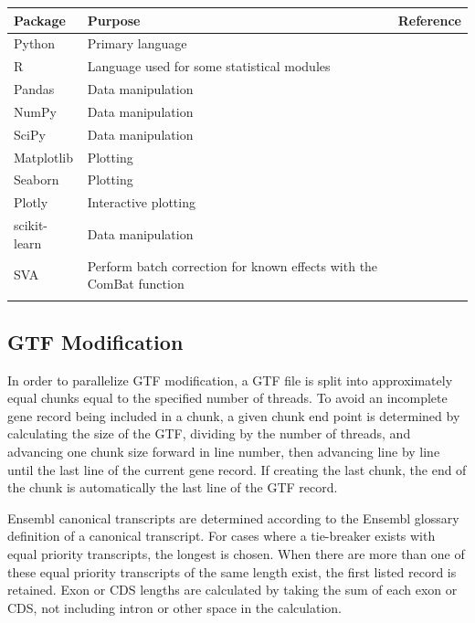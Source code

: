 \documentclass[10pt, oneside]{article}
\begin{document}
\begin{table}[!]
    \centering
{}
\begin{tabular}{p{2.4cm}p{7.5cm}p{3cm}}
 \textbf{Package} & \textbf{Purpose} & \textbf{Reference} \\
 \hline
 Python & Primary language & \\
 \hline
 R & Language used for some statistical modules & \\
 \hline
 Pandas & Data manipulation & \cite{pandas} \\
 \hline
 NumPy & Data manipulation & \cite{numpy1, numpy2} \\
 \hline
 SciPy & Data manipulation & \cite{scipy} \\
 \hline
 Matplotlib & Plotting & \cite{matplotlib} \\
 \hline
 Seaborn & Plotting & \cite{seaborn} \\
 \hline
 Plotly & Interactive plotting & \cite{plotly} \\
 \hline
 scikit-learn & Data manipulation & \cite{sklearn} \\
 \hline
 SVA & Perform batch correction for known effects with the ComBat function & \cite{sva} \\
 \label{Tab:software_plot}
 \end{tabular}
\end{table}

\subsection{GTF Modification}
In order to parallelize GTF modification, a GTF file is split into approximately equal chunks equal to the specified number of threads. To avoid an incomplete gene record being included in a chunk, a given chunk end point is determined by calculating the size of the GTF, dividing by the number of threads, and advancing one chunk size forward in line number, then advancing line by line until the last line of the current gene record. If creating the last chunk, the end of the chunk is automatically the last line of the GTF record. \par

Ensembl canonical transcripts are determined according to the Ensembl glossary definition of a canonical transcript. For cases where a tie-breaker exists with equal priority transcripts, the longest is chosen. When there are more than one of these equal priority transcripts of the same length exist, the first listed record is retained. Exon or CDS lengths are calculated by taking the sum of each exon or CDS, not including intron or other space in the calculation. \par
\end{document}
